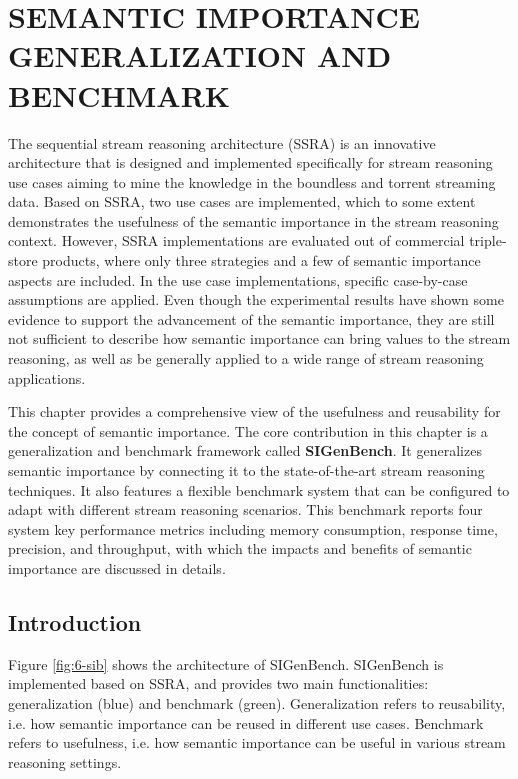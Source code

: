 \chapter{SEMANTIC IMPORTANCE GENERALIZATION AND BENCHMARK}
The sequential stream reasoning architecture (SSRA) is an innovative architecture that is designed and implemented specifically for stream reasoning use cases aiming to mine the knowledge in the boundless and torrent streaming data. 
Based on SSRA, two use cases are implemented, which to some extent demonstrates the usefulness of the semantic importance in the stream reasoning context. 
However, SSRA implementations are evaluated out of commercial triple-store products, where only three strategies and a few of semantic importance aspects are included.
In the use case implementations, specific case-by-case assumptions are applied. 
Even though the experimental results have shown some evidence to support the advancement of the semantic importance, they are still not sufficient to describe how semantic importance can bring values to the stream reasoning, as well as be generally applied to a wide range of stream reasoning applications.

This chapter provides a comprehensive view of the usefulness and reusability for the concept of semantic importance.
The core contribution in this chapter is a generalization and benchmark framework called \textbf{SIGenBench}. 
It generalizes semantic importance by connecting it to the state-of-the-art stream reasoning techniques.
It also features a flexible benchmark system that can be configured to adapt with different stream reasoning scenarios. 
This benchmark reports four system key performance metrics including memory consumption, response time, precision, and throughput, with which the impacts and benefits of semantic importance are discussed in details.  
%
\section{Introduction}
Figure \ref{fig:6-sib} shows the architecture of SIGenBench.
SIGenBench is implemented based on SSRA, and provides two main functionalities: generalization (blue) and benchmark (green).
Generalization refers to reusability, i.e. how semantic importance can be reused in different use cases.
Benchmark refers to usefulness, i.e. how semantic importance can be useful in various stream reasoning settings.

